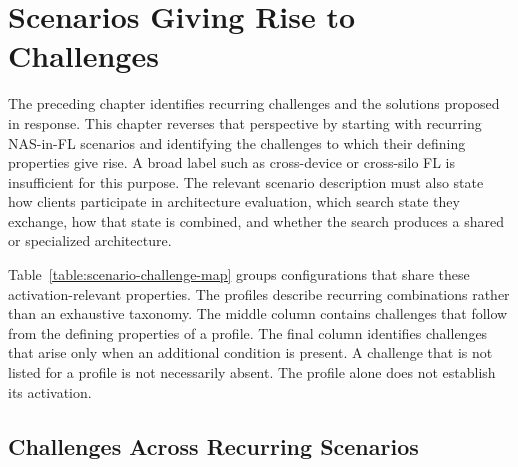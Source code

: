 \chapter{Scenarios Giving Rise to Challenges}\label{chapter:scenarios-and-challenges}

The preceding chapter identifies recurring challenges and the solutions proposed in response. This chapter reverses that perspective by starting with recurring NAS-in-FL scenarios and identifying the challenges to which their defining properties give rise. A broad label such as cross-device or cross-silo FL is insufficient for this purpose. The relevant scenario description must also state how clients participate in architecture evaluation, which search state they exchange, how that state is combined, and whether the search produces a shared or specialized architecture.

Table~\ref{table:scenario-challenge-map} groups configurations that share these activation-relevant properties. The profiles describe recurring combinations rather than an exhaustive taxonomy. The middle column contains challenges that follow from the defining properties of a profile. The final column identifies challenges that arise only when an additional condition is present. A challenge that is not listed for a profile is not necessarily absent. The profile alone does not establish its activation.

\section{Challenges Across Recurring Scenarios}

\begingroup
\footnotesize
\setlength{\tabcolsep}{3pt}
\renewcommand{\arraystretch}{1.08}
\setlength{\LTpre}{4pt}
\setlength{\LTpost}{4pt}

